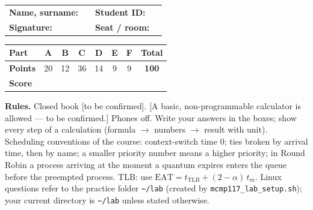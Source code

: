 \begin{center}
\renewcommand{\arraystretch}{1.6}
\begin{tabularx}{\linewidth}{@{}lX lX@{}}
\textbf{Name, surname:} & \hrulefill & \textbf{Student ID:} & \hrulefill \\
\textbf{Signature:} & \hrulefill & \textbf{Seat / room:} & \hrulefill \\
\end{tabularx}

\vspace{0.4em}
\renewcommand{\arraystretch}{1.35}
\begin{tabular}{|l|c|c|c|c|c|c|c|}
\hline
\textbf{Part} & A & B & C & D & E & F & \textbf{Total} \\ \hline
\textbf{Points} & 20 & 12 & 36 & 14 & 9 & 9 & \textbf{100} \\ \hline
\textbf{Score} & & & & & & & \\[0.4em] \hline
\end{tabular}
\end{center}

\textbf{Rules.} Closed book [to be confirmed]. [A basic, non-programmable calculator is allowed --- to be confirmed.] Phones off. Write your answers in the boxes; show every step of a calculation (formula $\to$ numbers $\to$ result with unit). Scheduling conventions of the course: context-switch time $0$; ties broken by arrival time, then by name; a smaller priority number means a higher priority; in Round Robin a process arriving at the moment a quantum expires enters the queue before the preempted process. TLB: use $\text{EAT} = t_{\text{TLB}} + (2-\alpha)\,t_m$. Linux questions refer to the practice folder \texttt{\textasciitilde/lab} (created by \texttt{mcmp117\_lab\_setup.sh}); your current directory is \texttt{\textasciitilde/lab} unless stated otherwise.

